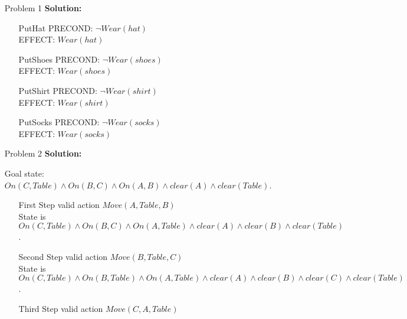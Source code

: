 \normalfont\documentclass[letterpaper,11pt]{article}
\begin{document}
\setlength{\parindent}{2ex}
\newcommand{\header}{
	\noindent {}
}
\bigskip
\header

\begin{enumerate}
\item[Problem 1]\textbf{Solution:}\par
\begin{enumerate}
	\item[PutHat]
		PRECOND: $\neg Wear(hat)$\\
		EFFECT: $Wear(hat)$
	\item[PutShoes]
		PRECOND: $\neg Wear(shoes)$\\
		EFFECT: $Wear(shoes)$
	\item[PutShirt]
		PRECOND: $\neg Wear(shirt)$\\
		EFFECT: $Wear(shirt)$
	\item[PutSocks]
		PRECOND: $\neg Wear(socks)$\\
		EFFECT: $Wear(socks)$
\end{enumerate}
\item[Problem 2]\textbf{Solution:}\par
	Goal state: 
	$On(C,Table) \land On(B,C) \land On(A,B) \land clear(A) \land clear(Table)$.\\
	\begin{enumerate}
		\item[First Step] valid action $Move(A,Table, B)$\\
			State is $On(C,Table) \land On(B,C) \land On(A,Table) \land clear(A) \land clear(B)\land clear(Table)$.\\
		\item[Second Step] valid action $Move(B,Table, C)$\\
			State is $On(C,Table) \land On(B,Table) \land On(A,Table) \land clear(A) \land clear(B)\land clear(C) \land clear(Table)$.\\
		\item[Third Step] valid action $Move(C,A,Table)$\\

\end{enumerate}
\end{enumerate}
\end{document}
